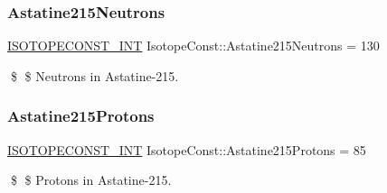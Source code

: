 \subsubsection{\texorpdfstring{Astatine215\+Neutrons}{Astatine215Neutrons}}
{\footnotesize\ttfamily \mbox{\hyperlink{group___isotope_const-_macros_ga5f18360b3e99483a35c32d789e62621c}{I\+S\+O\+T\+O\+P\+E\+C\+O\+N\+S\+T\+\_\+\+I\+NT}} Isotope\+Const\+::\+Astatine215\+Neutrons = 130}

\$ \$ Neutrons in Astatine-\/215. \mbox{\label{group___isotope_const-_astatine-_at215_ga2677186cef50b2131e410840811519df}} 
\subsubsection{\texorpdfstring{Astatine215\+Protons}{Astatine215Protons}}
{\footnotesize\ttfamily \mbox{\hyperlink{group___isotope_const-_macros_ga5f18360b3e99483a35c32d789e62621c}{I\+S\+O\+T\+O\+P\+E\+C\+O\+N\+S\+T\+\_\+\+I\+NT}} Isotope\+Const\+::\+Astatine215\+Protons = 85}

\$ \$ Protons in Astatine-\/215. 